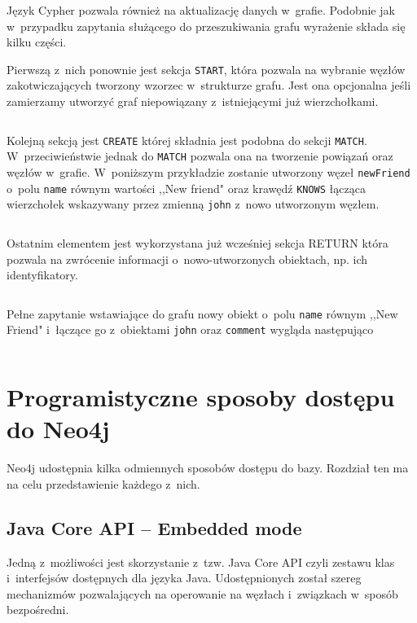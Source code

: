 \documentclass{xmgr}
\begin{document}
Język Cypher pozwala również na aktualizację danych w~grafie. Podobnie jak w~przypadku zapytania służącego do przeszukiwania grafu wyrażenie składa się kilku części.

Pierwszą z~nich ponownie jest sekcja \texttt{START}, która pozwala na wybranie węzłów zakotwiczających tworzony wzorzec w~strukturze grafu. Jest ona opcjonalna jeśli zamierzamy utworzyć graf niepowiązany z~istniejącymi już wierzchołkami.

\inputminted{cypher}{listings/cypher/start-section.cypher}

Kolejną sekcją jest \texttt{CREATE} której składnia jest podobna do sekcji \texttt{MATCH}. W~przeciwieństwie jednak do \texttt{MATCH} pozwala ona na tworzenie powiązań oraz węzłów w~grafie. W~poniższym przykładzie zostanie utworzony węzeł \texttt{newFriend} o~polu \texttt{name} równym wartości ,,New friend" oraz krawędź \texttt{KNOWS} łącząca wierzchołek wskazywany przez zmienną \texttt{john} z~nowo utworzonym węzłem.

\inputminted{cypher}{listings/cypher/create-section.cypher}

Ostatnim elementem jest wykorzystana już wcześniej sekcja RETURN która pozwala na zwrócenie informacji o~nowo-utworzonych obiektach, np. ich identyfikatory.

\inputminted{cypher}{listings/cypher/return-section-2.cypher}

Pełne zapytanie wstawiające do grafu nowy obiekt o~polu \texttt{name} równym ,,New Friend" i~łączące go z~obiektami \texttt{john} oraz \texttt{comment} wygląda następująco

\inputminted{cypher}{listings/cypher/sample-create-query.cypher}

\section{Programistyczne sposoby dostępu do Neo4j}

Neo4j udostępnia kilka odmiennych sposobów dostępu do bazy. Rozdział ten ma na celu przedstawienie każdego z~nich.

\subsection{Java Core API -- Embedded mode}

Jedną z~możliwości jest skorzystanie z~tzw. Java Core API czyli zestawu klas i~interfejsów dostępnych dla języka Java. Udostępnionych został szereg mechanizmów pozwalających na operowanie na węzłach i~związkach w~sposób bezpośredni.
\end{document}
